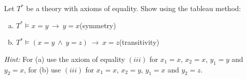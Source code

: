 \begin{problem} 
    
    Let $T^*$ be a theory with axioms of equality. Show using the tableau method:
    \begin{enumerate}[(a)]
        \item $T^*\models x=y\ \to\ y=x$\hfill(symmetry)
        \item $T^*\models (x=y\ \wedge\ y=z)\ \to\ x=z$\hfill(transitivity)
    \end{enumerate}
    {\it Hint:} For (a) use the axiom of equality $(iii)$ for $x_1=x$, $x_2=x$, $y_1=y$ and $y_2=x$, \newline
        for (b) use $(iii)$ for $x_1=x$, $x_2=y$, $y_1=x$ and $y_2=z$.
        
\end{problem}

  



